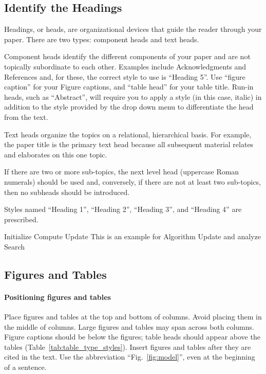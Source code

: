 \documentclass[conference, letterpaper]{IEEEtran}
\begin{document}
\subsection{Identify the Headings}
Headings, or heads, are organizational devices that guide the reader through your paper. There are two types: component heads and text heads.

Component heads identify the different components of your paper and are not topically subordinate to each other. Examples include Acknowledgments and References and, for these, the correct style to use is “Heading 5”. Use “figure caption” for your Figure captions, and “table head” for your table title. Run-in heads, such as “Abstract”, will require you to apply a style (in this case, italic) in addition to the style provided by the drop down menu to differentiate the head from the text.

Text heads organize the topics on a relational, hierarchical basis. For example, the paper title is the primary text head because all subsequent material relates and elaborates on this one topic.

If there are two or more sub-topics, the next level head (uppercase Roman numerals) should be used and, conversely, if there are not at least two sub-topics, then no subheads should be introduced.

Styles named “Heading 1”, “Heading 2”, “Heading 3”, and “Heading 4” are prescribed.

\begin{algorithm}
\caption{Heading}
\begin{algorithmic} %
\State Initialize
\State Compute
\While{}
        \State Update
				  \State This is an example for Algorithm
          \State Update and analyze
            \State Search
        \EndIf
    \EndFor
\EndWhile
\end{algorithmic}
\end{algorithm}

\subsection{Figures and Tables}
\paragraph{Positioning figures and tables} Place figures and tables at the top and bottom of columns. Avoid placing them in the middle of columns. Large figures and tables may span across both columns. Figure captions should be below the figures; table heads should appear above the tables (Table~\ref{tab:table_type_styles}). Insert figures and tables after they are cited in the text. Use the abbreviation “Fig.~\ref{fig:model}”, even at the beginning of a sentence.
\end{document}
